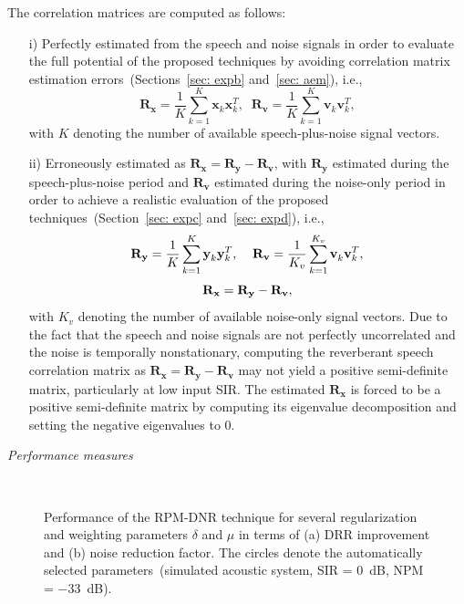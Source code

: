 \documentclass[10pt]{IEEEtran}
\begin{document}
The correlation matrices are computed as follows:
\begin{itemize}
  \item[i)] Perfectly estimated from the speech and noise signals in order to evaluate the full potential of the proposed techniques by avoiding correlation matrix estimation errors~(Sections~\ref{sec: expb} and~\ref{sec: aem}), i.e.,
\begin{equation}
\label{eq: corr}
\mathbf{R}_{\mathbf{x}} = \frac{1}{K} \sum_{k = 1}^{K} \mathbf{x}^{}_k \mathbf{x}^T_k, \; \; \mathbf{R}_{\mathbf{v}} = \frac{1}{K} \sum_{k = 1}^{K} \mathbf{v}^{}_k \mathbf{v}^T_k,
\end{equation}
with $K$ denoting the number of available speech-plus-noise signal vectors.
\item[ii)] Erroneously estimated as $\mathbf{R}_{\mathbf{x}} = \mathbf{R}_{\mathbf{y}} - \mathbf{R}_{\mathbf{v}}$, with $\mathbf{R}_{\mathbf{y}}$ estimated during the speech-plus-noise period and $\mathbf{R}_{\mathbf{v}}$ estimated during the noise-only period in order to achieve a realistic evaluation of the proposed techniques~(Section~\ref{sec: expc} and~\ref{sec: expd}), i.e., 
\begin{equation*}
\centering
\mathbf{R}_{\mathbf{y}} = \frac{1}{K} \sum_{k = 1}^{K} \mathbf{y}^{}_k \mathbf{y}^T_k, \; \; \; \; \mathbf{R}_{\mathbf{v}} = \frac{1}{K_v} \sum_{k = 1}^{K_v} \mathbf{v}^{}_k \mathbf{v}^T_k, 
\end{equation*}
\begin{equation}
\label{eq: corrdiff}
\centering
\mathbf{R}_{\mathbf{x}} = \mathbf{R}_{\mathbf{y}} - \mathbf{R}_{\mathbf{v}},
\end{equation}
with $K_v$ denoting the number of available noise-only signal vectors.
Due to the fact that the speech and noise signals are not perfectly uncorrelated and the noise is temporally nonstationary, computing the reverberant speech correlation matrix as $\mathbf{R}_{\mathbf{x}} = \mathbf{R}_{\mathbf{y}} - \mathbf{R}_{\mathbf{v}}$ may not yield a positive semi-definite matrix, particularly at low input SIR.
The estimated $\mathbf{R}_{\mathbf{x}}$ is forced to be a positive semi-definite matrix by computing its eigenvalue decomposition and setting the negative eigenvalues to $0$.
\end{itemize}

\vskip 5pt

\textit{Performance measures}

\vskip 5pt

\begin{figure}[t!]
\centering
\hbox{\subfloat[\label{fig: drr_rpdnr}]{%

}
\subfloat[\label{fig: nr_rpdnr}]{%

}}
\caption{Performance of the RPM-DNR technique for several regularization and weighting parameters $\delta$ and $\mu$ in terms of (a) DRR improvement  and (b) noise reduction factor. The circles denote the automatically selected parameters~(simulated acoustic system, SIR = $0$~dB, NPM = $-33$~dB).}
\label{fig: rpdnr}
\end{figure}
\end{document}
